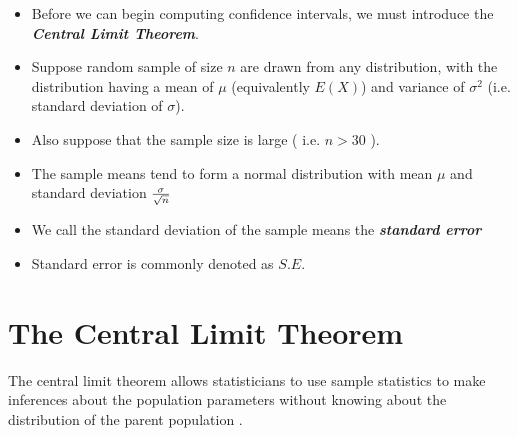 \documentclass[]{report}
\begin{document}
\begin{itemize}

\item Before we can begin computing confidence intervals, we must introduce the \textbf{\emph{Central Limit Theorem}}.

\item Suppose random sample of size $n$ are drawn from any distribution, with the distribution having a mean of $\mu$ (equivalently $E(X)$) and variance of $\sigma^2$ (i.e. standard deviation of $\sigma$).

\item Also suppose that the sample size is large ( i.e. $n > 30$ ).

\item The sample means tend to form a normal distribution with mean $\mu$ and standard deviation $ { \sigma \over \sqrt{n} }$

\item We call the standard deviation of the sample means the \textbf{\emph{standard error}}
\item Standard error is commonly denoted as $S.E.$
\end{itemize}


\section{The Central Limit Theorem}
The central limit theorem allows statisticians to use sample statistics to make inferences about the population parameters without knowing about the distribution of the parent population .
\end{document}
